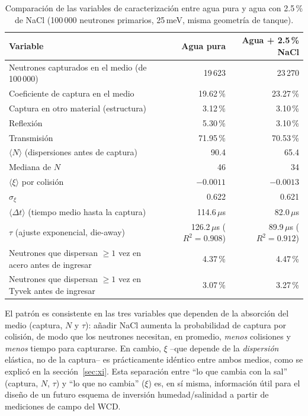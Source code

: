 \documentclass[11pt,a4paper]{article}
\begin{document}
\begin{table}[H]
\centering
\small
\begin{tabularx}{\linewidth}{X r r}
\toprule
\textbf{Variable} & \textbf{Agua pura} & \textbf{Agua + 2.5\,\% NaCl} \\
\midrule
Neutrones capturados en el medio (de 100\,000) & 19\,623 & 23\,270 \\
Coeficiente de captura en el medio & 19.62\,\% & 23.27\,\% \\
Captura en otro material (estructura) & 3.12\,\% & 3.10\,\% \\
Reflexión & 5.30\,\% & 3.10\,\% \\
Transmisión & 71.95\,\% & 70.53\,\% \\
\midrule
$\langle N\rangle$ (dispersiones antes de captura) & 90.4 & 65.4 \\
Mediana de $N$ & 46 & 34 \\
\midrule
$\langle\xi\rangle$ por colisión & $-0.0011$ & $-0.0013$ \\
$\sigma_\xi$ & 0.622 & 0.621 \\
\midrule
$\langle\Delta t\rangle$ (tiempo medio hasta la captura) & 114.6\,$\mu$s & 82.0\,$\mu$s \\
$\tau$ (ajuste exponencial, die-away) & 126.2\,$\mu$s ($R^2=0.908$) & 89.9\,$\mu$s ($R^2=0.912$) \\
\midrule
Neutrones que dispersan $\geq\!1$ vez en acero antes de ingresar & 4.37\,\% & 4.47\,\% \\
Neutrones que dispersan $\geq\!1$ vez en Tyvek antes de ingresar & 3.07\,\% & 3.27\,\% \\
\bottomrule
\end{tabularx}
\caption{Comparación de las variables de caracterización entre agua pura y agua con 2.5\,\% de NaCl
(100\,000 neutrones primarios, 25\,meV, misma geometría de tanque).}
\label{tab:comparativa}
\end{table}

El patrón es consistente en las tres variables que dependen de la absorción del medio (captura,
$N$ y $\tau$): añadir NaCl aumenta la probabilidad de captura por colisión, de modo que los
neutrones necesitan, en promedio, \emph{menos} colisiones y \emph{menos} tiempo para capturarse.
En cambio, $\xi$ --que depende de la \emph{dispersión} elástica, no de la captura-- es prácticamente
idéntico entre ambos medios, como se explicó en la sección~\ref{sec:xi}. Esta separación entre
``lo que cambia con la sal'' (captura, $N$, $\tau$) y ``lo que no cambia'' ($\xi$) es, en sí misma,
información útil para el diseño de un futuro esquema de inversión humedad/salinidad a partir de
mediciones de campo del WCD.
\end{document}
